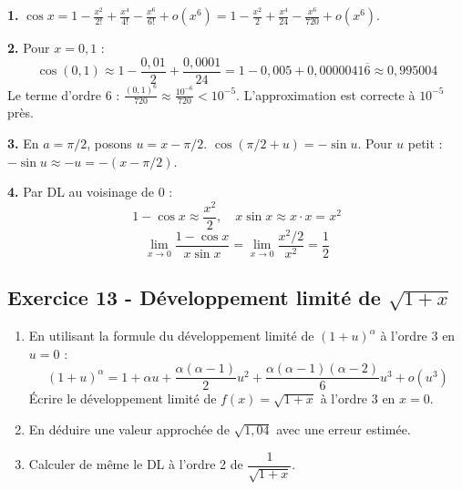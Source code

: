 \documentclass[12pt,a4paper]{article}
\begin{document}
\begin{boitecorrige}
\textbf{1.} $\cos x = 1-\frac{x^2}{2!}+\frac{x^4}{4!}-\frac{x^6}{6!}+o(x^6) = 1-\frac{x^2}{2}+\frac{x^4}{24}-\frac{x^6}{720}+o(x^6)$.

\textbf{2.} Pour $x=0{,}1$ :
\[
\cos(0{,}1) \approx 1-\frac{0{,}01}{2}+\frac{0{,}0001}{24} = 1-0{,}005+0{,}0000041\overline{6} \approx 0{,}995004
\]
Le terme d'ordre 6 : $\frac{(0{,}1)^6}{720} \approx \frac{10^{-6}}{720} < 10^{-5}$. L'approximation est correcte à $10^{-5}$ près.

\textbf{3.} En $a=\pi/2$, posons $u=x-\pi/2$. $\cos(\pi/2+u) = -\sin u$. Pour $u$ petit : $-\sin u\approx -u = -(x-\pi/2)$.

\textbf{4.} Par DL au voisinage de 0 :
\[
1-\cos x \approx \frac{x^2}{2}, \quad x\sin x \approx x\cdot x = x^2
\]
\[
\lim_{x\to0}\frac{1-\cos x}{x\sin x} = \lim_{x\to0}\frac{x^2/2}{x^2} = \frac{1}{2}
\]
\end{boitecorrige}


\subsection*{Exercice 13 - Développement limité de $\sqrt{1+x}$ \niveau{\facile}}
\begin{boiteexercice}
\begin{enumerate}
  \item En utilisant la formule du développement limité de $(1+u)^\alpha$ à l'ordre 3 en $u=0$ :
  \[
  (1+u)^\alpha = 1 + \alpha u + \frac{\alpha(\alpha-1)}{2}u^2 + \frac{\alpha(\alpha-1)(\alpha-2)}{6}u^3 + o(u^3)
  \]
  Écrire le développement limité de $f(x) = \sqrt{1+x}$ à l'ordre 3 en $x=0$.
  \item En déduire une valeur approchée de $\sqrt{1{,}04}$ avec une erreur estimée.
  \item Calculer de même le DL à l'ordre 2 de $\dfrac{1}{\sqrt{1+x}}$.
\end{enumerate}
\end{boiteexercice}
\end{document}
